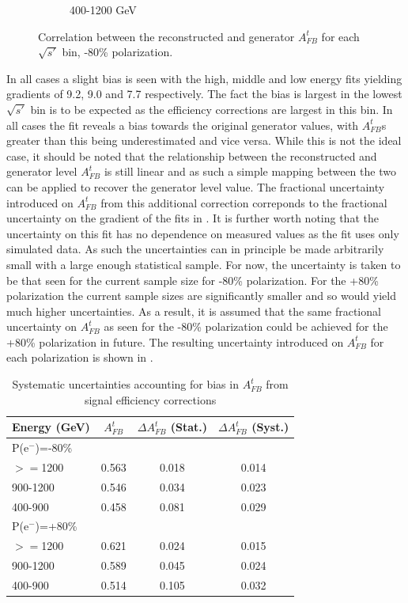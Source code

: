 \begin{figure}
\begin{subfigure}{.6\textwidth}
    \caption{400-1200 GeV}
  \end{subfigure}
  \caption{Correlation between the reconstructed and generator $A_{FB}^t$ for each $\sqrt{s'}$ bin, -80\% polarization.}
  \label{fig:biassys}
\end{figure}

In all cases a slight bias is seen with the high, middle and low energy fits yielding gradients of 9.2, 9.0 and 7.7 respectively. The fact the bias is largest in the lowest $\sqrt{s'}$ bin is to be expected as the efficiency corrections are largest in this bin. In all cases the fit reveals a bias towards the original generator values, with $A_{FB}^t$s greater than this being underestimated and vice versa. While this is not the ideal case, it should be noted that the relationship between the reconstructed and generator level $A_{FB}^t$ is still linear and as such a simple mapping between the two can be applied to recover the generator level value. The fractional uncertainty introduced on $A_{FB}^t$ from this additional correction correponds to the fractional uncertainty on the gradient of the fits in . It is further worth noting that the uncertainty on this fit has no dependence on measured values as the fit uses only simulated data. As such the uncertainties can in principle be made arbitrarily small with a large enough statistical sample. For now, the uncertainty is taken to be that seen for the current sample size for -80\% polarization. For the +80\% polarization the current sample sizes are significantly smaller and so would yield much higher uncertainties. As a result, it is assumed that the same fractional uncertainty on $A_{FB}^t$ as seen for the -80\% polarization could be achieved for the +80\% polarization in future. The resulting uncertainty introduced on $A_{FB}^t$ for each polarization is shown in .

\begin{table}
  \centering
  \begin{tabular}{l|c|c|c}
    \toprule
    Energy (GeV)& $A_{FB}^t$ & $\Delta A_{FB}^t$  (Stat.) & $\Delta A^t_{FB}$ (Syst.)  \\
    \midrule
    \midrule
    \multicolumn{4}{l}{P(e$^-$)=-80\%} \\
    \midrule
    \midrule
    $>=$1200   & 0.563 & 0.018 & 0.014\\
    \midrule
    900-1200   & 0.546 & 0.034 & 0.023\\
    \midrule
    400-900    & 0.458 & 0.081 & 0.029\\
    \midrule
    \midrule
    \multicolumn{4}{l}{ P(e$^-$)=+80\%}\\
    \midrule
    \midrule
    $>=$1200  & 0.621 & 0.024 & 0.015\\
    \midrule
    900-1200  & 0.589 & 0.045 & 0.024\\
    \midrule
    400-900   & 0.514 & 0.105 & 0.032\\
    \bottomrule
  \end{tabular}
  \caption{Systematic uncertainties accounting for bias in $A_{FB}^t$ from signal efficiency corrections}
  \label{tab:biassys}
\end{table}

